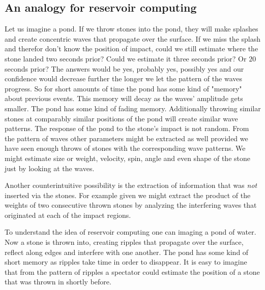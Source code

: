 \subsection{An analogy for reservoir computing}
	Let us imagine a pond. If we throw stones into the pond, they will make splashes and create concentric waves that propagate over the surface. If we miss the splash and therefor don't know the position of impact, could we still estimate where the stone landed two seconds prior? Could we estimate it three seconds prior? Or $20$ seconds prior? The answers would be yes, probably yes, possibly yes and our confidence would decrease further the longer we let the pattern of the waves progress. 
	So for short amounts of time the pond has some kind of "memory" about previous events. This memory will decay as the waves' amplitude gets smaller. The pond has some kind of fading memory.
	Additionally throwing similar stones at comparably similar positions of the pond will create similar wave patterns. The response of the pond to the stone's impact is not random. 
	From the pattern of waves other parameters might be extracted as well provided we have seen enough throws of stones with the corresponding wave patterns. 
	We might estimate size or weight, velocity, spin, angle and even shape of the stone just by looking at the waves. 
	
	Another counterintuitive possibility is the extraction of information that was \textit{not} inserted via the stones. For example given we might extract the product of the weights of two consecutive thrown stones by analyzing the interfering waves that originated at each of the impact regions. 
	
	
	

To understand the idea of reservoir computing one can imaging a pond of water. Now a stone is thrown into, creating ripples that propagate over the surface, reflect along edges and interfere with one another. The pond has some kind of short memory as ripples take time in order to disappear. 
It is easy to imagine that from the pattern of ripples a spectator could estimate the position of a stone that was thrown in shortly before.  